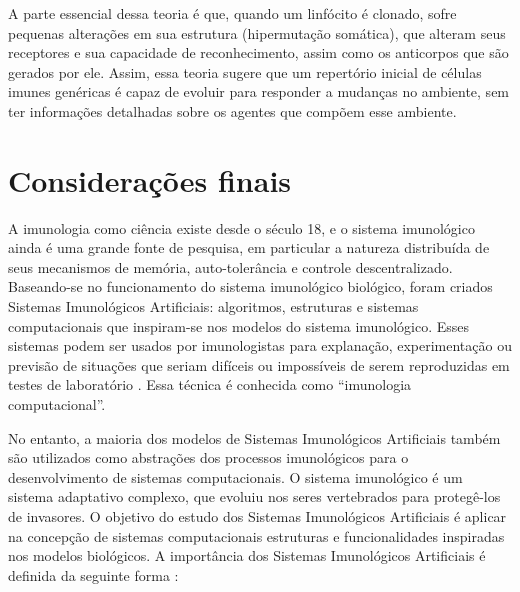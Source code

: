 A parte essencial dessa teoria é que, quando um linfócito é clonado, sofre pequenas alterações em sua estrutura (hipermutação somática), que alteram seus receptores e sua capacidade de reconhecimento, assim como os anticorpos que são gerados por ele. Assim, essa teoria sugere que um repertório inicial de células imunes genéricas é capaz de evoluir para responder a mudanças no ambiente, sem ter informações detalhadas sobre os agentes que compõem esse ambiente.

\section{Considerações finais}

A imunologia como ciência existe desde o século 18, e o sistema imunológico ainda é uma grande fonte de pesquisa, em particular a natureza distribuída de seus mecanismos de memória, auto-tolerância e controle descentralizado. Baseando-se no funcionamento do sistema imunológico biológico, foram criados Sistemas Imunológicos Artificiais: algoritmos, estruturas e sistemas computacionais que inspiram-se nos modelos do sistema imunológico. Esses sistemas podem ser usados por imunologistas para explanação, experimentação ou previsão de situações que seriam difíceis ou impossíveis de serem reproduzidas em testes de laboratório \cite{Garrett2005}. Essa técnica é conhecida como ``imunologia computacional''.

No entanto, a maioria dos modelos de Sistemas Imunológicos Artificiais também são utilizados como abstrações dos processos imunológicos para o desenvolvimento de sistemas computacionais. O sistema imunológico é um sistema adaptativo complexo, que evoluiu nos seres vertebrados para protegê-los de invasores. O objetivo do estudo dos Sistemas Imunológicos Artificiais é aplicar na concepção de sistemas computacionais estruturas e funcionalidades inspiradas nos modelos biológicos. A importância dos Sistemas Imunológicos Artificiais é definida da seguinte forma \cite{Dasgupta2006}:

